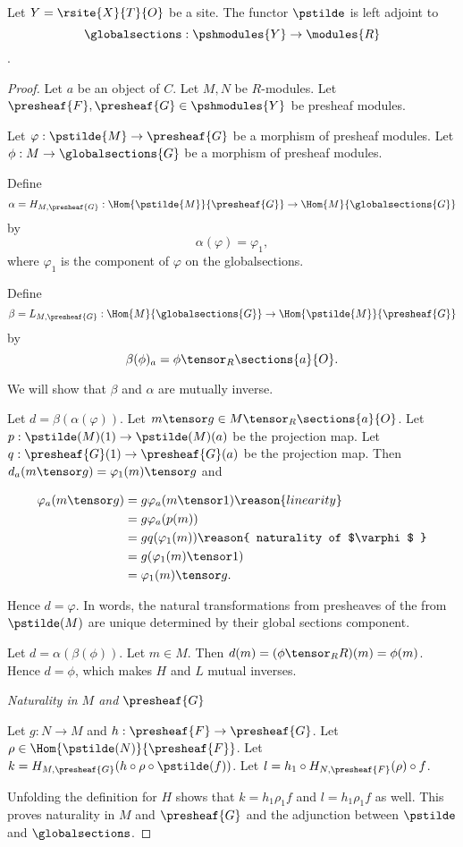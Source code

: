 \begin{lemma}
Let $Y = \rsite{X}{T}{O}$ be a site.
The functor $\pstilde$ is left adjoint to 
\[\globalsections:\pshmodules{Y} \rightarrow \modules{R}\].
\end{lemma}

\begin{proof}
Let $a$ be an object of $C$.
Let $M,N$ be $R$-modules. 
Let $\presheaf{F},\presheaf{G} \in \pshmodules{Y}$ be presheaf modules.

Let $\varphi:\pstilde{M} \rightarrow \presheaf{G}$ be a morphism of presheaf modules.
Let $\phi: M \rightarrow \globalsections{G}$ be a morphism of presheaf modules.

Define 
\[\alpha = H_{M,\presheaf{G}}: 
	\Hom{\pstilde{M}}{\presheaf{G}} \rightarrow \Hom{M}{\globalsections{G}}
\]
by
\[ \alpha(\varphi) = \varphi_1,\]
where $\varphi_1$ is the component of $\varphi$ on the globalsections.

Define 
\[\beta = L_{M,\presheaf{G}}: 
	\Hom{M}{\globalsections{G}} \rightarrow \Hom{\pstilde{M}}{\presheaf{G}}
\] 
by
\[ \beta(\phi)_a = \phi \tensor_R \sections{a}{O}.\]

We will show that $\beta$ and $\alpha$ are mutually inverse. 

Let $d = \beta(\alpha(\varphi))$. 
Let $m \tensor g \in M \tensor_R \sections{a}{O}$.
Let $p: \pstilde(M)(1)\rightarrow \pstilde(M)(a)$ be the projection map.
Let $q: \presheaf{G}(1)\rightarrow \presheaf{G}(a)$ be the projection map.
Then $d_a(m \tensor g) = \varphi_1(m) \tensor g$
and

\begin{align*}
	\varphi_a(m \tensor g) &=  g \varphi_a(m \tensor 1) \reason{ linearity }\\
		&= g \varphi_a(p(m)) \\
		&= g q(\varphi_1(m)) \reason{ naturality of $\varphi$ }\\
		&= g (\varphi_1(m) \tensor 1) \\
		&= \varphi_1(m) \tensor g.
\end{align*}

Hence $d = \varphi$. 
In words, the natural transformations from presheaves of the from $\pstilde(M)$ 
are unique determined by their global sections component.

Let $d = \alpha(\beta(\phi))$. 
Let $m \in M$.
Then $d(m) = (\phi \tensor_R R)(m) = \phi(m)$.
Hence $d = \phi$, which makes $H$ and $L$ mutual inverses.

\textit{Naturality in $M$ and $\presheaf{G}$}

Let $g:N\rightarrow M$ and $h:\presheaf{F} \rightarrow \presheaf{G}$.
Let $\rho \in \Hom{\pstilde(N)}{\presheaf{F}}$.
Let $k = H_{M,\presheaf{G}} (h \circ \rho \circ \pstilde(f))$.
Let $l = h_1 \circ H_{N,\presheaf{F}}(\rho) \circ f$.

Unfolding the definition for $H$ shows that $k = h_1\rho_1 f$
and $l = h_1\rho_1 f$ as well.
This proves naturality in $M$ and $\presheaf{G}$ 
and the adjunction between $\pstilde$ and $\globalsections$.
\end{proof}